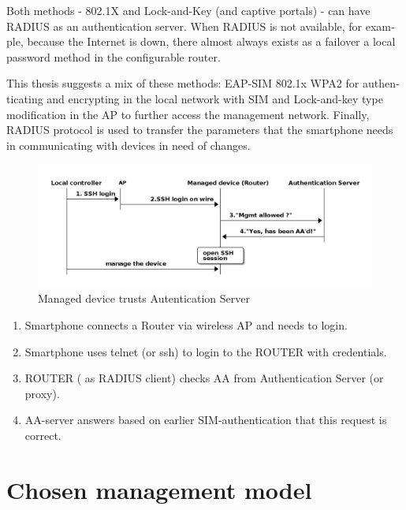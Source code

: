 \documentclass[12pt,a4paper,english]{tutthesis}
\begin{document}
\begin{otherlanguage}{english}
Both methods - 802.1X and Lock-and-Key (and captive portals) - can have RADIUS as an authentication server. 
When RADIUS is not available, for example, because the Internet is down,
there almost always exists as a failover a local password method in the configurable 
router.








This thesis suggests a mix of these methods: EAP-SIM 802.1x WPA2 for
authenticating and encrypting in the local network with SIM and
Lock-and-key type modification in the AP to further access the 
management network. Finally, RADIUS protocol is used to transfer 
the parameters that the smartphone  needs in communicating with 
devices in need of changes.

\begin{figure}[htb]
\centering
\includegraphics[width=.9\linewidth]{trust-register.png}
\caption{\label{fig:trust-register}Managed device trusts Autentication Server}
\end{figure}





\begin{enumerate}
\item Smartphone connects a Router via wireless AP and needs to login.
\item Smartphone uses telnet (or ssh) to login to the ROUTER
with credentials.
\item ROUTER ( as RADIUS client) checks AA from Authentication Server (or 
proxy).
\item AA-server answers based on earlier SIM-authentication that this
request is correct.
\end{enumerate}



\section{Chosen management model}
\label{sec-4-5}






\end{otherlanguage}
\end{document}
